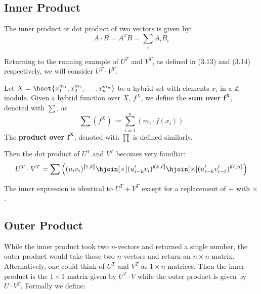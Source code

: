 \subsection{Inner Product}

The inner product or dot product of two vectors is given by:
\begin{equation}
A \cdot B = A^T B = \sum_i A_i B_i
\end{equation}

Returning to the running example of $U^T$ and $V^T$, as defined in (3.13) and (3.14) respectively, we will consider $U^T \cdot V^T$.

\begin{definition}
	Let $X = \hset{x_1^{m_1}, x_2^{m_2}, \ldots , x_n^{m_n} }$ be a hybrid set with elements $x_i$ in a $\mathbb{Z}$-module.
	Given a hybrid function over $X$,  $f^X$, we define the \textbf{sum over $\boldsymbol{f^X}$}, denoted with $\sum$, as
	\begin{equation}
		\sum \! \left( f^X \right)  := \sum_{i=1}^n \left( m_i \cdot f(x_i) \right)
	\end{equation}
	The \textbf{product over $\boldsymbol{f^X}$}, denoted with $\prod$ is defined similarly.
\end{definition}

Then the dot product of $U^T$ and $V^T$ becomes very familiar:
\begin{equation}
	U^T \cdot V^T = \sum \left( (u_i v_i)^{[\![1, k]\!]} 
		\hjoin[\times] (u'_{i-k} v_i)^{(\!(k,\ell]\!]} 
		\hjoin[\times] (u'_{i-k} v'_{i-\ell})^{(\!(\ell,n]\!]} \right)
\end{equation}

The inner expression is identical to $U^T + V^T$ except for a replacement of $+$ with $\times$.




\subsection{Outer Product}

While the inner product took two $n$-vectors and returned a single number,
the outer product would take those two $n$-vectors and return an $n \times n$ matrix.
Alternatively, one could think of $U^T$ and $V^T$ as $1\times n$ matrices.
Then the inner product is the $1\times 1$ matrix given by $U^T \cdot V$ 
while the outer product is given by $U \cdot V^T$. Formally we define:

